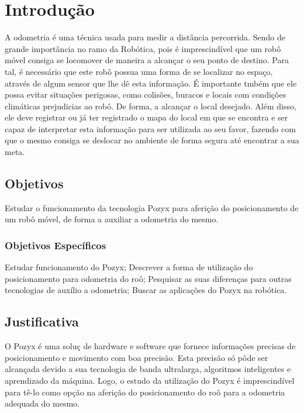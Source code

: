 \chapter{Introdução}
\label{chap:intro}

A odometria \'e uma t\'ecnica usada para medir a dist\^ancia percorrida. Sendo de grande import\^ancia no ramo da Rob\'otica, pois \'e imprescind\'ivel que um rob\^o m\'ovel consiga se locomover de maneira a alcan\c{c}ar o seu ponto de destino.
Para tal, \'e necess\'ario que este rob\^o possua uma forma de se localizar no espa\c{c}o, atrav\'es de algum sensor que lhe d\^e esta informa\c{c}\~ao.
\'E importante tmb\'em que ele possa evitar situa\c{c}\~oes perigosas, como colis\~oes, buracos e locais com condi\c{c}\~oes clim\'aticas prejudicias ao rob\^o. De forma, a alcan\c{c}ar o local desejado.
Al\'em disso, ele deve registrar ou j\'a ter registrado o mapa do local em que se encontra e ser capaz de interpretar esta informa\c{c}\~ao para ser utilizada ao seu favor, fazendo com que o mesmo consiga se deslocar no ambiente de forma segura at\'e encontrar a sua meta.

\section{Objetivos}
\label{sec:obj}

Estudar o funcionamento da tecnologia Pozyx para aferi\c{c}\~ao do posicionamento de um rob\^o m\'ovel, de forma a auxiliar a odometria do mesmo.


\subsection{Objetivos Específicos}
\label{ssec:objesp}

Estudar funcionamento do Pozyx;
Descrever a forma de utiliza\c{c}\~ao do posicionamento para odometria do ro\^o;
Pesquisar as suas diferen\c{c}as para outras tecnologias de aux\'ilio a odometria;
Buscar as aplica\c{c}\~oes do Pozyx na rob\'otica.


\section{Justificativa}
\label{sec:justi}

O Pozyx \'e uma solu\c{c} de hardware e software que fornece informa\c{c}\~oes precisas de posicionamento e movimento com boa precis\~ao.
Esta precis\~ao s\'o p\^ode ser alcan\c{c}ada devido a sua tecnologia de banda ultralarga, algoritmos inteligentes e aprendizado da m\'aquina.
Logo, o estudo da utiliza\c{c}\~ao do Pozyx \'e imprescind\'ivel para t\^e-lo como op\c{c}\~ao na aferi\c{c}\~ao do posicionamento do ro\^o para a odometria adequada do mesmo. 


